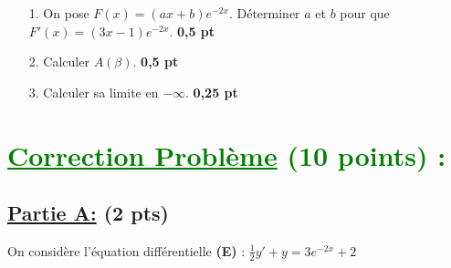 \documentclass[12pt]{article}
\begin{document}
\begin{itemize}
    \item[1.] On pose $F(x) = (ax + b)e^{-2x}$. Déterminer $a$ et $b$ pour que $F'(x) = (3x - 1)e^{-2x}$. \textbf{0,5 pt}
    \item[2.] Calculer $A(\beta)$. \textbf{0,5 pt}
    \item[3.] Calculer sa limite en $-\infty$. \textbf{0,25 pt}
\end{itemize}
\section*{\textcolor{green}{\underline{Correction Problème} (10 points) :}}
\subsection*{\underline{Partie A:} (2 pts)}
On considère l'équation différentielle \textbf{(E)} : $\frac{1}{2}y' + y = 3e^{-2x} + 2$
\end{document}
